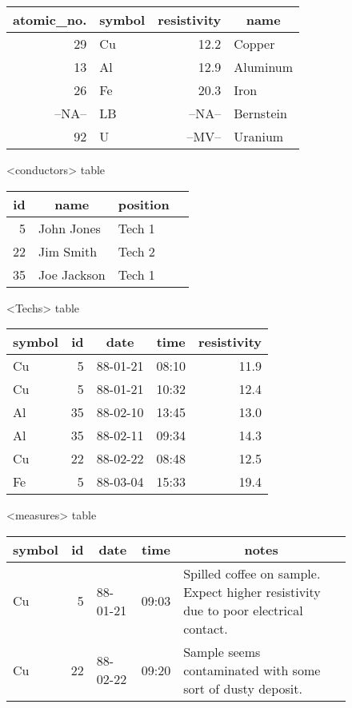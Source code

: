 \documentclass[11pt,a4paper]{report}
\begin{document}
 
\begin{figure}[htp]
\begin{center}
  \begin{tabular}[t]{|r|l|r|l|}
     \hline
     \multicolumn{1}{|c|}{atomic\_no.}&
     \multicolumn{1}{|c|}{symbol}&
     \multicolumn{1}{|c|}{resistivity}&
     \multicolumn{1}{|c|}{name}\\
     \hline
    29& Cu& 12.2  & Copper\\
    13& Al& 12.9  & Aluminum\\
    26& Fe& 20.3  & Iron\\
--NA--& LB&--NA--& Bernstein\\
    92& U &--MV--  & Uranium\\
     \hline
  \end{tabular}
 
  \smallskip
          {<conductors> table }
 
  \bigskip
  \begin{tabular}[t]{|r|l|l|l|}
     \hline
     \multicolumn{1}{|c|}{id}&
     \multicolumn{1}{|c|}{name}&
     \multicolumn{1}{|c|}{position}\\
     \hline
     5& John Jones& Tech 1\\
    22& Jim Smith& Tech 2\\
    35& Joe Jackson& Tech 1\\
     \hline
  \end{tabular}
 
  \smallskip
          {<Techs> table }
 
  \bigskip
  \begin{tabular}[t]{|l|r|l|l|r|}
     \hline
     \multicolumn{1}{|c|}{symbol}&
     \multicolumn{1}{|c|}{id}&
     \multicolumn{1}{|c|}{date}&
     \multicolumn{1}{|c|}{time}&
     \multicolumn{1}{|c|}{resistivity}\\
     \hline
    Cu& 5& 88-01-21& 08:10& 11.9 \\
    Cu& 5& 88-01-21& 10:32& 12.4 \\
    Al&35& 88-02-10& 13:45& 13.0 \\
    Al&35& 88-02-11& 09:34& 14.3 \\
    Cu&22& 88-02-22& 08:48& 12.5 \\
    Fe& 5& 88-03-04& 15:33& 19.4 \\
     \hline
  \end{tabular}
 
  \medskip
          {<measures> table }
 
  \bigskip
  \begin{tabular}[t]{|l|r|l|l|p{2.0in}|}
     \hline
     \multicolumn{1}{|c|}{symbol}&
     \multicolumn{1}{|c|}{id}&
     \multicolumn{1}{|c|}{date}&
     \multicolumn{1}{|c|}{time}&
     \multicolumn{1}{|c|}{notes}\\
     \hline
    Cu& 5& 88-01-21& 09:03& Spilled coffee on sample.  Expect higher
        resistivity due to poor electrical contact.\\
    Cu&22& 88-02-22& 09:20& Sample seems contaminated with some
        sort of dusty deposit.\\
     \hline
  \end{tabular}
 

\end{center}
\end{figure}
\end{document}
